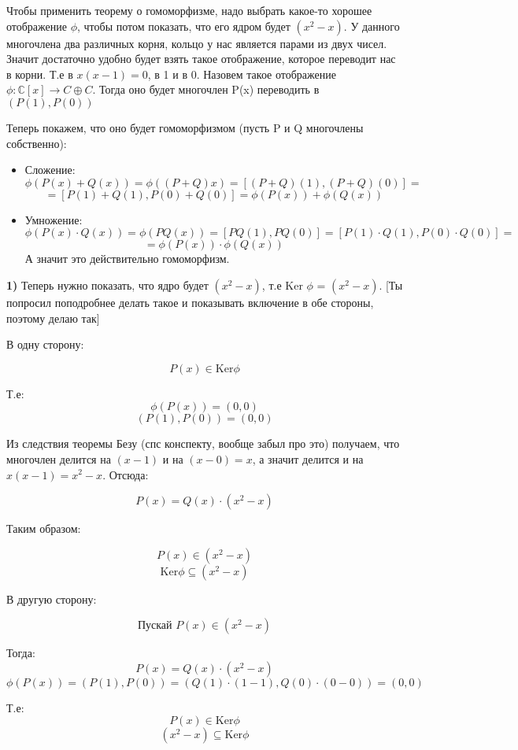 \documentclass[a4paper,12pt]{article}
\begin{document}
Чтобы применить теорему о гомоморфизме, надо выбрать какое-то хорошее отображение $\phi$, чтобы потом показать, что его ядром будет $(x^2 - x)$. У данного многочлена два различных корня, кольцо у нас является парами из двух чисел. Значит достаточно удобно будет взять такое отображение, которое переводит нас в корни. Т.е в $x(x - 1) = 0$, в 1 и в 0. Назовем такое отображение $\phi : \mathbb{C}[x] \rightarrow C \oplus C$.  Тогда оно будет многочлен P(x) переводить в $(P(1), P(0))$

Теперь покажем, что оно будет гомоморфизмом (пусть P и Q многочлены собственно):
\begin{itemize}
\item Сложение:
\[
\phi \left(P(x) + Q(x) \right) = \phi \left((P + Q)x \right) = \left[ (P + Q)(1), (P + Q)(0) \right] =
\]
\[
= \left[P(1) + Q(1), P(0) + Q(0) \right] = \phi \left( P(x) \right) + \phi \left( Q(x) \right)
\]
\item Умножение:
\[
\phi \left( P(x) \cdot Q(x) \right) = \phi \left(PQ(x) \right) = \left[PQ(1), PQ(0) \right] = \left[P(1) \cdot Q(1), P(0) \cdot Q(0) \right] =
\]
\[
=  \phi \left(P(x) \right) \cdot \phi \left( Q(x) \right)
\]
А значит это действительно гомоморфизм.
\end{itemize}
\clearpage
\textbf{1)} Теперь нужно показать, что ядро будет $(x^2 - x)$, т.е Ker $\phi$ = $(x^2 - x)$. [Ты попросил поподробнее делать такое и показывать включение в обе стороны, поэтому делаю так]

В одну сторону:

$$P(x) \in \text{Ker} \phi $$

Т.е:
$$\phi(P(x)) = (0, 0)$$
$$ (P(1), P(0)) = (0, 0) $$

Из следствия теоремы Безу (спс конспекту, вообще забыл про это) получаем, что многочлен делится на $(x - 1)$ и на $(x - 0) = x$, а значит делится и на $x(x-1) = x^2 - x$. Отсюда:

$$P(x) = Q(x) \cdot (x^2 - x)$$

Таким образом:

$$P(x) \in (x^2 - x)$$
$$\text{Ker} \phi \subseteq (x^2 - x)$$

В другую сторону:

$$\text{Пускай } P(x) \in (x^2 - x)$$

Тогда:
$$  P(x) = Q(x) \cdot (x^2 - x)$$
$$\phi(P(x)) = (P(1), P(0)) = \left(Q(1) \cdot (1 - 1), Q(0) \cdot (0 - 0) \right) = (0, 0)    $$


Т.е:
$$
P(x) \in \text{Ker} \phi
$$
$$
(x^2 - x) \subseteq \text{Ker} \phi
$$
\end{document}
